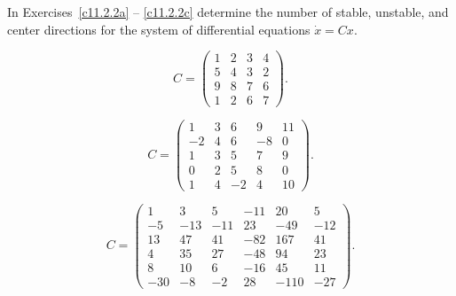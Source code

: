 \documentclass{ximera}
\begin{document}
\noindent In Exercises~\ref{c11.2.2a} -- \ref{c11.2.2c} determine the number
of stable, unstable, and center directions for the system of differential 
equations $\dot{x}=Cx$.
\begin{exercise} \label{c11.2.2a}
\begin{equation*}
C=\left(\begin{array}{rrrr}
     1  &   2   &  3   &  4 \\
     5  &   4   &  3   &  2\\
     9  &   8   &  7   &  6\\
     1  &   2    & 6   &  7
\end{array}\right).
\end{equation*}
\end{exercise}
\begin{exercise} \label{c11.2.2b}
\begin{equation*}
C=\left(\begin{array}{rrrrr}
     1   &  3  &   6   &  9   & 11 \\
    -2   &  4  &   6   & -8   & 0 \\
     1   &  3  &   5   &  7   & 9 \\
     0   &  2  &   5   &  8   &  0 \\
     1   &  4  &  -2   &  4   & 10
\end{array}\right).
\end{equation*}
\end{exercise}
\begin{exercise} \label{c11.2.2c}
\begin{equation*}
C=\left(\begin{array}{rrrrrr}
    1  &  3  &  5  & -11 &  20  &   5 \\
   -5  & -13 & -11 &  23 & -49  & -12 \\
   13  &  47 &  41 & -82 & 167  &  41 \\
    4  &  35 &  27 & -48 &  94  &  23 \\
    8  &  10 &   6 & -16 &  45  &  11 \\
  -30  &  -8 &  -2 &  28 &-110  & -27
\end{array}\right).
\end{equation*}
\end{exercise}
\end{document}
